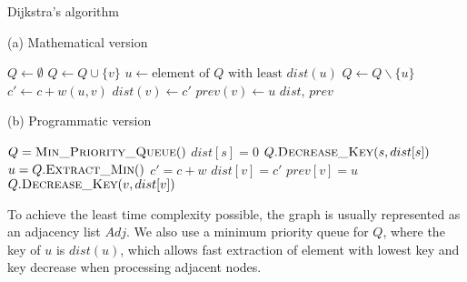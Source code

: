 \begin{algorithm}[H]
    \caption{Dijkstra's algorithm}
    \label{alg-dijkstra}
    \begin{minipage}[t]{0.49\linewidth}
        (a) Mathematical version
        \begin{algorithmic}[1]
                \State $Q \gets \emptyset$
                    \State $Q \gets Q \cup \{v\}$
                \EndFor
                    \State $u \gets \text{element of } Q \text{ with least } dist(u)$
                    \State $Q \gets Q \backslash \{u\}$
                        \State $c' \gets c + w(u, v)$
                            \State $dist(v) \gets c'$
                            \State $prev(v) \gets u$
                        \EndIf
                    \EndFor
                \EndWhile
                \State \Return $dist$, $prev$
            \EndFunction
        \end{algorithmic}
    \end{minipage}
    \begin{minipage}[t]{0.49\linewidth}
        (b) Programmatic version
        \begin{algorithmic}[1]
                \State $Q = \Call{Min\_Priority\_Queue}{ }$
                \EndFor
                \State $dist[s] = 0$
                \State $Q.\Call{Decrease\_Key}{s, dist[s]}$
                    \State $u = Q.\Call{Extract\_Min}{ }$
                        \State $c' = c + w$
                            \State $dist[v] = c'$
                            \State $prev[v] = u$
                            \State $Q.\Call{Decrease\_Key}{v, dist[v]}$
                        \EndIf
                    \EndFor
                \EndWhile
                \State {}
            \EndFunction
        \end{algorithmic}
    \end{minipage}
\end{algorithm}
To achieve the least time complexity possible, the graph is usually represented as an adjacency list $Adj$. We also use a minimum priority queue for $Q$, where the key of $u$ is $dist(u)$, which allows fast extraction of element with lowest key and key decrease when processing adjacent nodes.
